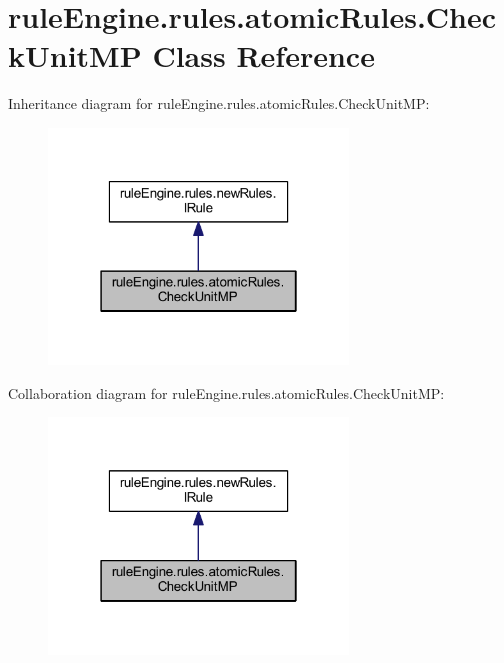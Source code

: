 \hypertarget{classrule_engine_1_1rules_1_1atomic_rules_1_1_check_unit_m_p}{}\section{rule\+Engine.\+rules.\+atomic\+Rules.\+Check\+Unit\+MP Class Reference}
\label{classrule_engine_1_1rules_1_1atomic_rules_1_1_check_unit_m_p}


Inheritance diagram for rule\+Engine.\+rules.\+atomic\+Rules.\+Check\+Unit\+MP\+:
\nopagebreak
\begin{figure}[H]
\begin{center}
\leavevmode
\includegraphics[width=226pt]{classrule_engine_1_1rules_1_1atomic_rules_1_1_check_unit_m_p__inherit__graph}
\end{center}
\end{figure}


Collaboration diagram for rule\+Engine.\+rules.\+atomic\+Rules.\+Check\+Unit\+MP\+:
\nopagebreak
\begin{figure}[H]
\begin{center}
\leavevmode
\includegraphics[width=226pt]{classrule_engine_1_1rules_1_1atomic_rules_1_1_check_unit_m_p__coll__graph}
\end{center}
\end{figure}
